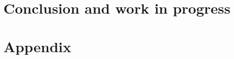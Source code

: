 
\part{Conclusion and work in progress}


\cleardoublepage


\appendix

\part{Appendix}


\cleardoublepage

\cleardoublepage

\cleardoublepage

\clearpage




